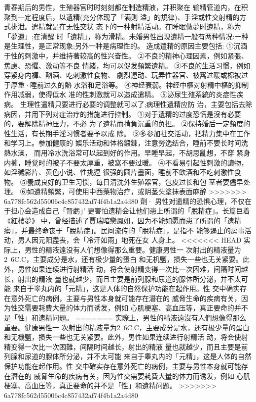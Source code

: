 \documentclass[12pt,UTF8]{ctexbook}
\begin{document}
青春期后的男性，生殖器官时时刻刻都在制造精液，并积聚在
输精管道内，在积聚到一定程度后，以遺精(充分体现了「满则
溢」的規律)、手淫或性交射精的方式排泄。遣精就是在无性交状
态下的一种射精活动。在睡眠做夢时遺精，称为「夢遺」;在清醒
时「遺精」，称为滑精。未婚男性出现遺精一般有两种情况:一种
是生理性，是正常现象;另外一种是病理性的。
造成遣精的原因主要包括:
①沉湎于性的刺激中，并维持著较高的性兴奋性。
②不良的精神心理因素，例如紧張、焦慮、恐懼、激动等不良
情緒，均可以促发頻繁遺精。
③不良的生活习惯，例如穿紧身内褲、酗酒、吃刺激性食物、
劇烈運动、玩弄性器官、被窩过暖或棉被过于厚重·睡前过久的熱
水浴和足浴等。
④神经衰弱。神经中樞对射精中樞的抑制作用减弱，使得低水
准的性刺激就可以造成遣精。
⑤泌尿生殖系統的炎症性疾病。
生理性遣精只要进行必要的调整就可以了;病理性遺精应防
治，主要包括去除病因，并用下列对症治疗的措施进行控制。
①对于遺精的过度恐慌是沒有必要的，要解除精神压力，不必
为了遺精而掯負沉重的负担。
②保持婚后一定頻度的性生活，有长期手淫习惯者要予以戒
除。
③多参加社交活动，把精力集中在工作和学习上。参加健康的
娛乐活动和体格鍛鍊，注意勞逸结合，睡前不要长时间洗熱水澡，
而用冷水洗浴常可以起到好的作用。早睡早起，不胡思亂想，不穿
紧身内褲，睡觉时的被子不要太厚重，被窩不要过暖。
④不看易引起性刺激的讀物，如淫穢影片、黄色小说、性挑逗
很强的圆片畫面，睡前不飲酒和不吃刺激性食物。
⑤養成良好的卫生习惯，每日清洗外生殖器官，包皮过长和包
茎者要儘早处理。
⑥如遺精頻繁，可使用中西藥物治疗，或阴茎头塗抹表面麻醉
>>>>>>> 6a778fc562d55006c4c857432af74f4b1a2a4d80
劑·
男性对遗精的恐惧心理，不仅在于担心会造成自己「腎虧」’
更害怕遗精会让他们患上所谓的「脫精症」。长篇巨着《紅樓夢》
中，曾经描述了賈瑞暗戀鳳姐，因为不能如愿而患了所谓的「遗精
癆」，并最终命丧于「脫精症」。民间流传的「脫精症」，是指不
能够遏止的房事活动，男人因元阳盡丧，会「冷汗如雨」地死在女
人身上。
<<<<<<< HEAD
实际上，男性的精液遠没有人们想像得那么重要。健康男性一
次射出的精液量为2~6C.C，主要成分是水，还有极少量的蛋白
和无机鹽，损失一些也无关紧要。此外，男性如果连续进行射精活
动，将会使射精变得一次比一次困难，间隔时间越长，射出的精液
量也就越少，而且主要是前列腺和尿道的腺体所分泌，并不太可能
来自于睾丸内的「元精」，这是人体的自然保护功能在起作用。性
交中确实存在意外死亡的病例，主要与男性本身就可能存在潛在的
威脅生命的疾病有关，因为性交需要耗費大量的体力而诱发，例如
心肌梗塞、高血压等，真正要命的并不是「性」和遗精问题。
=======
实際上，男性的精液遠沒有人們想像得那么重要。健康男性一
次射出的精液量为2~6C.C，主要成分是水，还有极少量的蛋白
和无機鹽，损失一些也无关紧要。此外，男性如果连续进行射精活
动，将会使射精变得一次比一次困難，间隔时间越长，射出的精液
量也就越少，而且主要是前列腺和尿道的腺体所分泌，并不太可能
来自于睾丸内的「元精」，这是人体的自然保护功能在起作用。性
交中確实存在意外死亡的病例，主要与男性本身就可能存在潛在的
威脅生命的疾病有关，因为性交需要耗費大量的体力而诱发，例如
心肌梗塞、高血压等，真正要命的并不是「性」和遺精问題。
>>>>>>> 6a778fc562d55006c4c857432af74f4b1a2a4d80
\end{document}
